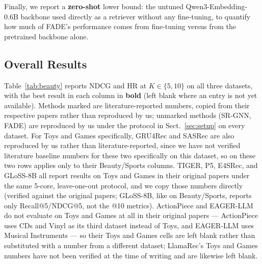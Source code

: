 \documentclass[runningheads]{llncs}
\begin{document}
Finally, we report a \textbf{zero-shot} lower bound: the untuned Qwen3-Embedding-0.6B backbone used directly as a retriever without any fine-tuning, to quantify how much of FADE's performance comes from fine-tuning versus from the pretrained backbone alone.

\subsection{Overall Results}
\label{sec:results}

Table~\ref{tab:beauty} reports NDCG and HR at $K \in \{5,10\}$ on all three datasets, with the best result in each column in \textbf{bold} (left blank where an entry is not yet available). Methods marked \textdagger{} are literature-reported numbers, copied from their respective papers rather than reproduced by us; unmarked methods (SR-GNN, FADE) are reproduced by us under the protocol in Sect.~\ref{sec:setup} on every dataset. For Toys and Games specifically, GRU4Rec and SASRec are also reproduced by us rather than literature-reported, since we have not verified literature baseline numbers for these two specifically on this dataset, so \textdagger{} on these two rows applies only to their Beauty/Sports columns. TIGER, P5, E4SRec, and GLoSS-8B all report results on Toys and Games in their original papers under the same 5-core, leave-one-out protocol, and we copy those numbers directly (verified against the original papers; GLoSS-8B, like on Beauty/Sports, reports only Recall@5/NDCG@5, not the @10 metrics). ActionPiece and EAGER-LLM do not evaluate on Toys and Games at all in their original papers --- ActionPiece uses CDs and Vinyl as its third dataset instead of Toys, and EAGER-LLM uses Musical Instruments --- so their Toys and Games cells are left blank rather than substituted with a number from a different dataset; LlamaRec's Toys and Games numbers have not been verified at the time of writing and are likewise left blank.
\end{document}
